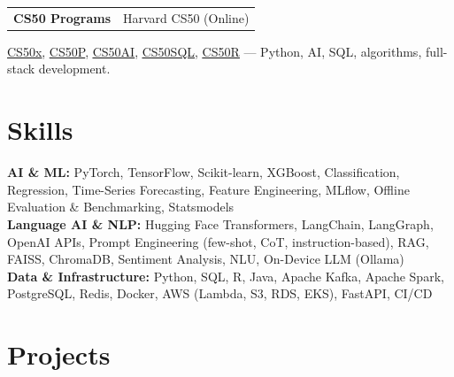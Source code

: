 \documentclass[a4paper,10pt]{article}
\newcommand{\ulink}[2]{\href{#1}{\uline{#2}}}
\newcommand{\subheading}[1]{{\color[HTML]{0A0A0A}\fontsize{11}{13}\selectfont\bfseries #1}}
\newcommand{\meta}[1]{{\color[HTML]{5C5C5C}\fontsize{9.5}{11.5}\selectfont #1}}
\begin{document}
\vspace{2pt}

\begin{tabularx}{\linewidth}{@{}X r@{}}
\subheading{CS50 Programs} & \meta{Harvard CS50 (Online)}
\end{tabularx}
\vspace{1pt}
{\color[HTML]{3A3A3A}\fontsize{10}{13}\selectfont \ulink{https://cs50.harvard.edu/certificates/b14b78df-e05c-413e-a607-1dd27303053a}{CS50x}, \ulink{https://cs50.harvard.edu/certificates/32477052-9db4-49c4-a5a4-d7e58429ca2c}{CS50P}, \ulink{https://cs50.harvard.edu/certificates/9cdb4d4a-1250-4f8e-9fd7-191864e0f919}{CS50AI}, \ulink{https://cs50.harvard.edu/certificates/bc486f24-f085-4e61-8536-80940b97a1b9}{CS50SQL}, \ulink{https://cs50.harvard.edu/certificates/666838e6-a053-4d82-b179-a60fe745fd84}{CS50R} --- Python, AI, SQL, algorithms, full-stack development.}

\vspace{2pt}

\section{Skills}
\vspace{2pt}
{\color[HTML]{0A0A0A}\fontsize{10}{13}\selectfont
\textbf{AI \& ML:} PyTorch, TensorFlow, Scikit-learn, XGBoost, Classification, Regression, Time-Series Forecasting, Feature Engineering, MLflow, Offline Evaluation \& Benchmarking, Statsmodels \\[1.5pt]
\textbf{Language AI \& NLP:} Hugging Face Transformers, LangChain, LangGraph, OpenAI APIs, Prompt Engineering (few-shot, CoT, instruction-based), RAG, FAISS, ChromaDB, Sentiment Analysis, NLU, On-Device LLM (Ollama) \\[1.5pt]
\textbf{Data \& Infrastructure:} Python, SQL, R, Java, Apache Kafka, Apache Spark, PostgreSQL, Redis, Docker, AWS (Lambda, S3, RDS, EKS), FastAPI, CI/CD}

\vspace{2pt}

\section{Projects}
\vspace{2pt}
\end{document}
